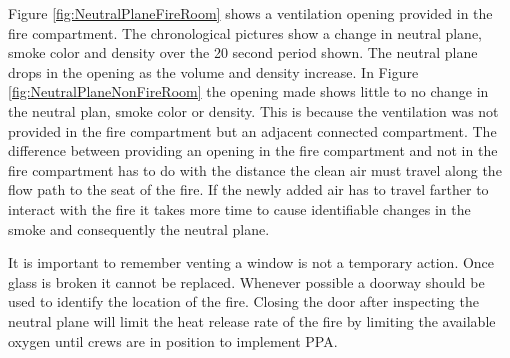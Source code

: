 \documentclass{article}
\begin{document}
Figure \ref{fig:NeutralPlaneFireRoom} shows a ventilation opening provided in the fire compartment. The chronological pictures show a change in neutral plane, smoke color and density over the 20 second period shown. The neutral plane drops in the opening as the volume and density increase. In Figure \ref{fig:NeutralPlaneNonFireRoom} the opening made shows little to no change in the neutral plan, smoke color or density. This is because the ventilation was not provided in the fire compartment but an adjacent connected compartment. The difference between providing an opening in the fire compartment and not in the fire compartment has to do with the distance the clean air must travel along the flow path to the seat of the fire. If the newly added air has to travel farther to interact with the fire it takes more time to cause identifiable changes in the smoke and consequently the neutral plane.

It is important to remember venting a window is not a temporary action. Once glass is broken it cannot be replaced. Whenever possible a doorway should be used to identify the location of the fire. Closing the door after inspecting the neutral plane will  limit the heat release rate of the fire by limiting the available oxygen until crews are in position to implement PPA. 
\end{document}
